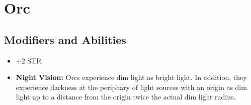 \section{Orc}\label{orc}

\subsection{Modifiers and Abilities}
\begin{itemize}
    \item +2 STR
    \item \textbf{Night Vision:} Orcs experience dim light as bright light. In
        addition, they experience darkness at the periphary of light sources
        with an origin as dim light up to a distance from the origin twice the
        actual dim light radius.
\end{itemize}
